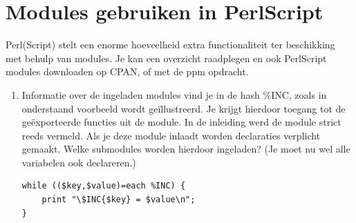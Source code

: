 \documentclass[11pt,a4paper]{report}
\begin{document}
\section{Modules gebruiken in PerlScript}
Perl(Script) stelt een enorme hoeveelheid extra functionaliteit ter beschikking met behulp van modules. Je kan een overzicht raadplegen en ook PerlScript modules downloaden op CPAN, of met de ppm opdracht.
\begin{enumerate}
	\item Informatie over de ingeladen modules vind je in de hash \%INC, zoals in onderstaand voorbeeld wordt geïllustreerd. Je krijgt hierdoor toegang tot de geëxporteerde functies uit de module.
	In de inleiding werd de module strict reeds vermeld. Als je deze module inlaadt worden declaraties verplicht gemaakt. Welke submodules worden hierdoor ingeladen? (Je moet nu wel alle variabelen ook declareren.)
\begin{lstlisting}
while (($key,$value)=each %INC) {
	print "\$INC{$key} = $value\n";
} 
\end{lstlisting}
\end{enumerate}
\end{document}
